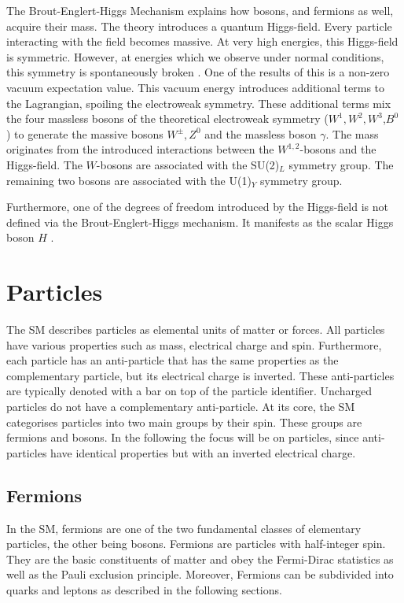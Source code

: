 \documentclass[bachelor,ngerman,english]{GAUBM}
\begin{document}
The Brout-Englert-Higgs Mechanism \cite{theory:higgs_mechanism_01,theory:higgs_mechanism_02,theory:higgs_mechanism_03} explains how bosons, and fermions as well, acquire their mass. The theory introduces a quantum Higgs-field. Every particle interacting with the field becomes massive. At very high energies, this Higgs-field is symmetric. However, at energies which we observe under normal conditions, this symmetry is spontaneously broken \cite{theory:spontaneous_symmetry_breaking}. One of the results of this is a non-zero vacuum expectation value. This vacuum energy introduces additional terms to the Lagrangian, spoiling the electroweak symmetry. These additional terms mix the four massless bosons of the theoretical electroweak symmetry ($W^1,W^2,W^3$,$B^0$) to generate the massive bosons $W^\pm, Z^0$ and the massless boson $\gamma$. The mass originates from the introduced interactions between the $W^{1,2}$-bosons and the Higgs-field. The $W$-bosons are associated with the SU(2)$_L$ symmetry group. The remaining two bosons are associated with the U(1)$_Y$ symmetry group.

Furthermore, one of the degrees of freedom introduced by the Higgs-field is not defined via the Brout-Englert-Higgs mechanism. It manifests as the scalar Higgs boson $H$ \cite{theory:higgs_mechanism_01}.


\section{Particles}
\label{sec:theory:particles}
The SM describes particles as elemental units of matter or forces. All particles have various properties such as mass, electrical charge and spin. Furthermore, each particle has an anti-particle that has the same properties as the complementary particle, but its electrical charge is inverted. These anti-particles are typically denoted with a bar on top of the particle identifier. Uncharged particles do not have a complementary anti-particle. At its core, the SM categorises particles into two main groups by their spin. These groups are fermions and bosons. In the following the focus will be on particles, since anti-particles have identical properties but with an inverted electrical charge. 


\subsection*{Fermions}
In the SM, fermions are one of the two fundamental classes of elementary particles, the other being bosons. Fermions are particles with half-integer spin. They are the basic constituents of matter and obey the Fermi-Dirac statistics as well as the Pauli exclusion principle. Moreover, Fermions can be subdivided into quarks and leptons as described in the following sections. 
\end{document}
